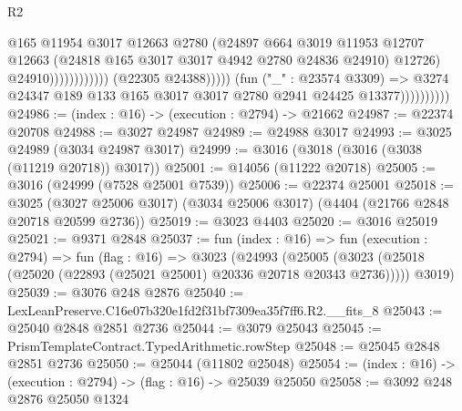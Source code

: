 \begin{lexlean}{R2}
\begin{coremodule}
                                                      @165
                                                      @11954
                                                      @3017
                                                      @12663
                                                      @2780
                                                      (@24897
                                                        @664
                                                        @3019
                                                        @11953
                                                        @12707
                                                        @12663
                                                        (@24818
                                                          @165
                                                          @3017
                                                          @3017
                                                          @4942
                                                          @2780
                                                          @24836
                                                          @24910)
                                                        @12726)
                                                      @24910))))))))))))
                              (@22305 @24388)))))
                      (fun ("_" : @23574 @3309) =>
                      @3274 @24347 @189 @133 @165 @3017 @3017 @2780 @2941 @24425 @13377))))))))))
@24986 := (index : @16) -> (execution : @2794) -> @21662
@24987 := @22374 @20708
@24988 := @3027 @24987
@24989 := @24988 @3017
@24993 := @3025 @24989 (@3034 @24987 @3017)
@24999 := @3016 (@3018 (@3016 (@3038 (@11219 @20718)) @3017))
@25001 := @14056 (@11222 @20718)
@25005 := @3016 (@24999 (@7528 @25001 @7539))
@25006 := @22374 @25001
@25018 := @3025 (@3027 @25006 @3017) (@3034 @25006 @3017) (@4404 (@21766 @2848 @20718 @20599 @2736))
@25019 := @3023 @4403
@25020 := @3016 @25019
@25021 := @9371 @2848
@25037 := fun (index : @16) =>
  fun (execution : @2794) =>
  fun (flag : @16) =>
  @3023
    (@24993
      (@25005 (@3023 (@25018 (@25020 (@22893 (@25021 @25001) @20336 @20718 @20343 @2736)))))
      @3019)
@25039 := @3076 @248 @2876
@25040 := LexLeanPreserve.C16e07b320e1fd2f31bf7309ea35f7ff6.R2.__fits_8
@25043 := @25040 @2848 @2851 @2736
@25044 := @3079 @25043
@25045 := PrismTemplateContract.TypedArithmetic.rowStep
@25048 := @25045 @2848 @2851 @2736
@25050 := @25044 (@11802 @25048)
@25054 := (index : @16) -> (execution : @2794) -> (flag : @16) -> @25039 @25050
@25058 := @3092 @248 @2876 @25050 @1324

\end{coremodule}
\end{lexlean}
